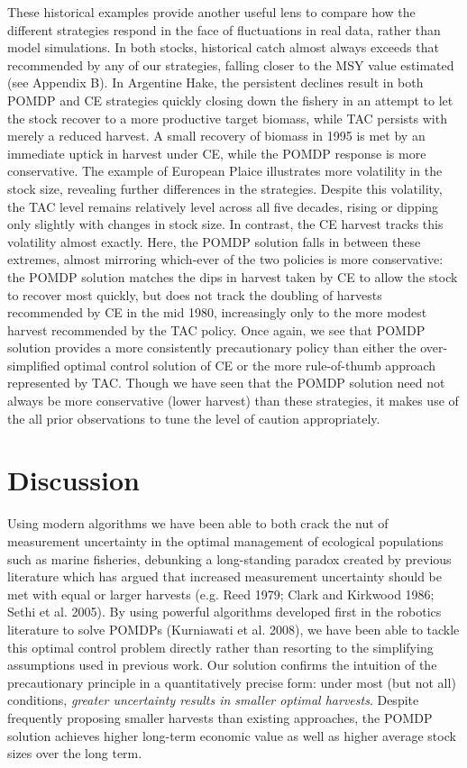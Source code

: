 \documentclass[3p]{elsarticle} %
\begin{document}
These historical examples provide another useful lens to compare how the
different strategies respond in the face of fluctuations in real data,
rather than model simulations. In both stocks, historical catch almost
always exceeds that recommended by any of our strategies, falling closer
to the MSY value estimated (see Appendix B). In Argentine Hake, the
persistent declines result in both POMDP and CE strategies quickly
closing down the fishery in an attempt to let the stock recover to a
more productive target biomass, while TAC persists with merely a reduced
harvest. A small recovery of biomass in 1995 is met by an immediate
uptick in harvest under CE, while the POMDP response is more
conservative. The example of European Plaice illustrates more volatility
in the stock size, revealing further differences in the strategies.
Despite this volatility, the TAC level remains relatively level across
all five decades, rising or dipping only slightly with changes in stock
size. In contrast, the CE harvest tracks this volatility almost exactly.
Here, the POMDP solution falls in between these extremes, almost
mirroring which-ever of the two policies is more conservative: the POMDP
solution matches the dips in harvest taken by CE to allow the stock to
recover most quickly, but does not track the doubling of harvests
recommended by CE in the mid 1980, increasingly only to the more modest
harvest recommended by the TAC policy. Once again, we see that POMDP
solution provides a more consistently precautionary policy than either
the over-simplified optimal control solution of CE or the more
rule-of-thumb approach represented by TAC. Though we have seen that the
POMDP solution need not always be more conservative (lower harvest) than
these strategies, it makes use of the all prior observations to tune the
level of caution appropriately.

\hypertarget{discussion}{%
\section{Discussion}\label{discussion}}

Using modern algorithms we have been able to both crack the nut of
measurement uncertainty in the optimal management of ecological
populations such as marine fisheries, debunking a long-standing paradox
created by previous literature which has argued that increased
measurement uncertainty should be met with equal or larger harvests
(e.g. Reed 1979; Clark and Kirkwood 1986; Sethi et al. 2005). By using
powerful algorithms developed first in the robotics literature to solve
POMDPs (Kurniawati et al. 2008), we have been able to tackle this
optimal control problem directly rather than resorting to the
simplifying assumptions used in previous work. Our solution confirms the
intuition of the precautionary principle in a quantitatively precise
form: under most (but not all) conditions, \emph{greater uncertainty
results in smaller optimal harvests}. Despite frequently proposing
smaller harvests than existing approaches, the POMDP solution achieves
higher long-term economic value as well as higher average stock sizes
over the long term.
\end{document}
